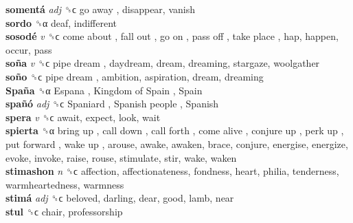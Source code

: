 \textbf{somentá} \emph{adj}  ␝ϲ   go away , disappear, vanish  \\
\textbf{sordo} ␝α  deaf, indifferent  \\
\textbf{sosodé} \emph{v}  ␝ϲ   come about ,  fall out ,  go on ,  pass off ,  take place , hap, happen, occur, pass  \\
\textbf{soña} \emph{v}  ␝ϲ   pipe dream , daydream, dream, dreaming, stargaze, woolgather  \\
\textbf{soño} ␝ϲ   pipe dream , ambition, aspiration, dream, dreaming  \\
\textbf{Spaña} ␝α   Espana ,  Kingdom of Spain ,  Spain   \\
\textbf{spañó} \emph{adj}  ␝ϲ   Spaniard ,  Spanish people ,  Spanish   \\
\textbf{spera} \emph{v}  ␝ϲ  await, expect, look, wait  \\
\textbf{spierta} ␝α   bring up ,  call down ,  call forth ,  come alive ,  conjure up ,  perk up ,  put forward ,  wake up , arouse, awake, awaken, brace, conjure, energise, energize, evoke, invoke, raise, rouse, stimulate, stir, wake, waken  \\
\textbf{stimashon} \emph{n}  ␝ϲ  affection, affectionateness, fondness, heart, philia, tenderness, warmheartedness, warmness  \\
\textbf{stimá} \emph{adj}  ␝ϲ  beloved, darling, dear, good, lamb, near  \\
\textbf{stul} ␝ϲ  chair, professorship  \\
